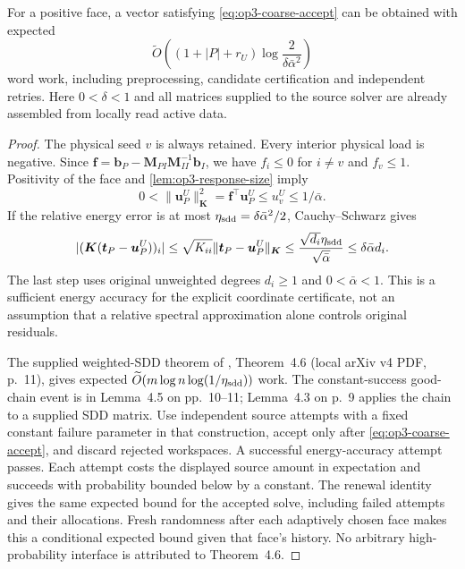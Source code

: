 \begin{lemma}
\label{lem:op3-certified-sparse-solve}
For a positive face, a vector satisfying \cref{eq:op3-coarse-accept} can
be obtained with expected
\begin{equation}
 \widetilde O\!\left((1+|P|+r_U)
       \log\frac{2}{\delta\bar\alpha^2}\right)
 \label{eq:op3-certified-coarse-source-work}
\end{equation}
word work, including preprocessing, candidate certification and independent
retries. Here $0<\delta<1$ and all matrices supplied to the source solver
are already assembled from locally read active data.
\end{lemma}
\begin{proof}
The physical seed $v$ is always retained. Every interior physical load is
negative. Since
$\bm f=\bm b_P-\bm M_{PI}\bm M_{II}^{-1}\bm b_I$,
we have $f_i\leq0$ for $i\ne v$ and $f_v\leq1$. Positivity of the face
and \cref{lem:op3-response-size} imply
\[
 0<\|\bm u_P^U\|_{\bm K}^2
   =\bm f^\top\bm u_P^U\leq u_v^U\leq1/\bar\alpha.
\]
If the relative energy error is at most
$\eta_{\rm sdd}=\delta\bar\alpha^2/2$, Cauchy--Schwarz gives
\[
 |(\bm K(\bm t_P-\bm u_P^U))_i|
 \leq\sqrt{K_{ii}}\|\bm t_P-\bm u_P^U\|_{\bm K}
 \leq\frac{\sqrt{d_i}\eta_{\rm sdd}}{\sqrt{\bar\alpha}}
 \leq\delta\bar\alpha d_i.
\]
The last step uses original unweighted degrees $d_i\geq1$ and
$0<\bar\alpha<1$. This is a sufficient energy accuracy for the explicit
coordinate certificate, not an assumption that a relative spectral
approximation alone controls original residuals.

The supplied weighted-SDD theorem of \citet{koutis2011nearly},
Theorem~4.6 (local arXiv v4 PDF, p.~11), gives expected
$\widetilde O(m\log n\log(1/\eta_{\rm sdd}))$ work.
The constant-success good-chain event is in Lemma~4.5 on pp.~10--11;
Lemma~4.3 on p.~9 applies the chain to a supplied SDD matrix.
Use independent source attempts with a fixed constant failure parameter
in that construction, accept only after \cref{eq:op3-coarse-accept}, and
discard rejected workspaces. A successful energy-accuracy attempt passes.
Each attempt costs the displayed source amount in expectation and succeeds
with probability bounded below by a constant. The renewal identity gives
the same expected bound for the accepted solve, including failed attempts
and their allocations. Fresh randomness after each adaptively chosen face
makes this a conditional expected bound given that face's history.
No arbitrary high-probability interface is attributed to Theorem~4.6.
\end{proof}

